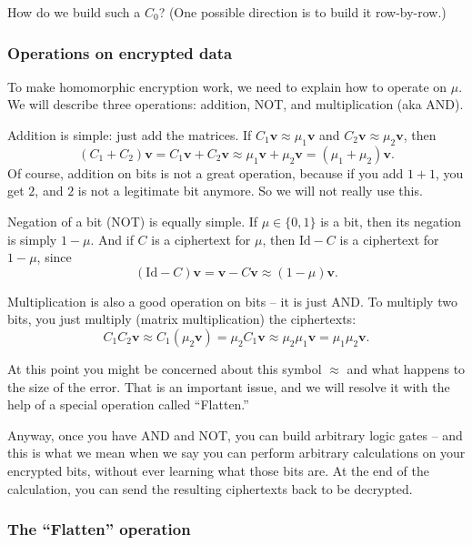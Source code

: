 \begin{problem}
How do we build such a \(C_{0}\)? (One possible direction is to build it
row-by-row.)
\end{problem}

\subsubsection{Operations on encrypted data}

To make homomorphic encryption work, we need to explain how to operate
on \(\mu\). We will describe three operations: addition, NOT, and
multiplication (aka AND).

Addition is simple: just add the matrices. If
\(C_{1}\mathbf{v} \approx \mu_{1}\mathbf{v}\) and
\(C_{2}\mathbf{v} \approx \mu_{2}\mathbf{v}\), then
\[( C_{1} + C_{2} )\mathbf{v} = C_{1}\mathbf{v} + C_{2}\mathbf{v} \approx \mu_{1}\mathbf{v} + \mu_{2}\mathbf{v} = ( \mu_{1} + \mu_{2} )\mathbf{v}.\]
Of course, addition on bits is not a great operation, because if you add
\(1 + 1\), you get \(2\), and \(2\) is not a legitimate bit anymore. So
we will not really use this.

Negation of a bit (NOT) is equally simple. If
\(\mu \in \{ 0,1 \}\) is a bit, then its negation is simply
\(1 - \mu\). And if \(C\) is a ciphertext for \(\mu\), then
\(\mathrm{Id} - C\) is a ciphertext for \(1 - \mu\), since
\[( \mathrm{Id} - C )\mathbf{v} = \mathbf{v} - C\mathbf{v} \approx (1 - \mu)\mathbf{v}.\]

Multiplication is also a good operation on bits -- it is just AND. To
multiply two bits, you just multiply (matrix multiplication) the
ciphertexts:
\[C_{1}C_{2}\mathbf{v} \approx C_{1}( \mu_{2}\mathbf{v} ) = \mu_{2}C_{1}\mathbf{v} \approx \mu_{2}\mu_{1}\mathbf{v} = \mu_{1}\mu_{2}\mathbf{v}.\]

At this point you might be concerned about this symbol \(\approx\) and
what happens to the size of the error. That is an important issue, and
we will resolve it with the help of a special operation called
``Flatten.''

Anyway, once you have AND and NOT, you can build arbitrary logic gates
-- and this is what we mean when we say you can perform arbitrary
calculations on your encrypted bits, without ever learning what those
bits are. At the end of the calculation, you can send the resulting
ciphertexts back to be decrypted.

\subsubsection{The ``Flatten''
operation}\label{a-constraint-on-the-secret-key-mathbfv-and-the-flatten-operation}

